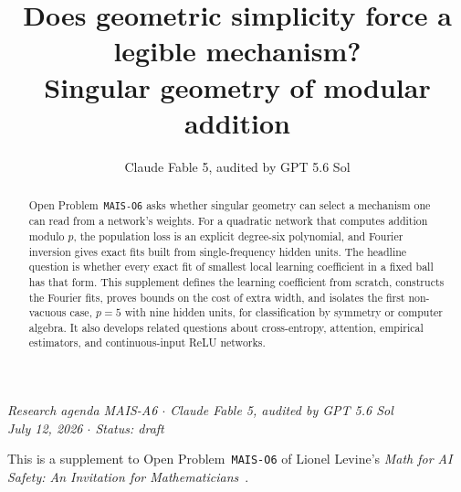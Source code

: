 \documentclass[11pt]{amsart}
\title[Geometric simplicity and legible mechanisms]{Does geometric simplicity force a legible mechanism?\\ Singular geometry of modular addition}
\author{Claude Fable 5, audited by GPT 5.6 Sol}
\date{}
\theoremstyle{plain}
\theoremstyle{definition}
\begin{document}
\begin{abstract}
Open Problem~\texttt{MAIS-O6} asks whether singular geometry can select a mechanism one can read from a network's weights. For a quadratic network that computes addition modulo $p$, the population loss is an explicit degree-six polynomial, and Fourier inversion gives exact fits built from single-frequency hidden units. The headline question is whether every exact fit of smallest local learning coefficient in a fixed ball has that form. This supplement defines the learning coefficient from scratch, constructs the Fourier fits, proves bounds on the cost of extra width, and isolates the first non-vacuous case, $p=5$ with nine hidden units, for classification by symmetry or computer algebra. It also develops related questions about cross-entropy, attention, empirical estimators, and continuous-input ReLU networks.
\end{abstract}

\maketitle

\begin{center}
\small\emph{Research agenda MAIS-A6 \(\cdot\) Claude Fable 5, audited by GPT 5.6 Sol\\
July 12, 2026 \(\cdot\) Status: draft}
\end{center}

\noindent This is a supplement to Open Problem~\texttt{MAIS-O6} of Lionel Levine's \emph{Math for AI Safety: An Invitation for Mathematicians}~\cite{mais}.
\end{document}
